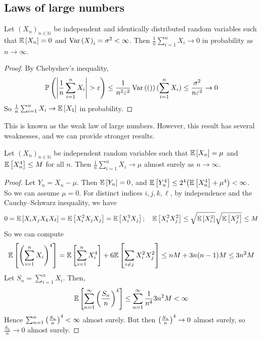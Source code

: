 \subsection{Laws of large numbers}
\begin{proposition}
	Let \( (X_n)_{n \in \mathbb N} \) be independent and identically distributed random variables such that \( \mathbb{E}\left[{X_n}\right] = 0 \) and \( \operatorname{Var}\left({X}\right)_i = \sigma^2 < \infty \).
	Then \( \frac{1}{n} \sum_{i=1}^n X_i \to 0 \) in probability as \( n \to \infty \).
\end{proposition}
\begin{proof}
	By Chebyshev's inequality,
	\[ \mathbb{P}\left({\abs{\frac{1}{n}\sum_{i=1}^n X_i} > \varepsilon}\right) \leq \frac{1}{n^2 \varepsilon^2} \operatorname{Var}\left({\qty}\right)(\sum_{i=1}^n X_i) \leq \frac{\sigma^2}{n\varepsilon^2} \to 0 \]
	So \( \frac{1}{n} \sum_{i=1}^n X_i \to \mathbb{E}\left[{X_1}\right] \) in probability.
\end{proof}
This is known as the weak law of large numbers.
However, this result has several weaknesses, and we can provide stronger results.
\begin{proposition}
	Let \( (X_n)_{n \in \mathbb N} \) be independent random variables such that \( \mathbb{E}\left[{X_n}\right] = \mu \) and \( \mathbb{E}\left[{X_n^4}\right] \leq M \) for all \( n \).
	Then \( \frac{1}{n} \sum_{i=1}^n X_i \to \mu \) almost surely as \( n \to \infty \).
\end{proposition}
\begin{proof}
	Let \( Y_n = X_n - \mu \).
	Then \( \mathbb{E}\left[{Y_n}\right] = 0 \), and \( \mathbb{E}\left[{Y_n^4}\right] \leq 2^4 \qty(\mathbb{E}\left[{X_n^4}\right] + \mu^4) < \infty \).
	So we can assume \( \mu = 0 \).
	For distinct indices \( i, j, k, \ell \), by independence and the Cauchy--Schwarz inequality, we have
	\[ 0 = \mathbb{E}\left[{X_i X_j X_k X_\ell}\right] = \mathbb{E}\left[{X_i^2 X_j X_j}\right] = \mathbb{E}\left[{X_i^3 X_j}\right];\quad \mathbb{E}\left[{X_i^2 X_j^2}\right] \leq \sqrt{\mathbb{E}\left[{X_i^2}\right]}\sqrt{\mathbb{E}\left[{X_j^2}\right]} \leq M \]
	So we can compute
	\[ \mathbb{E}\left[{\qty(\sum_{i=1}^n X_i)^4}\right] = \mathbb{E}\left[{\sum_{i=1}^n X_i^4}\right] + 6\mathbb{E}\left[{\sum_{i \neq j} X_i^2 X_j^2}\right] \leq nM + 3n(n-1)M \leq 3n^2 M \]
	Let \( S_n = \sum_{i=1}^n X_i \).
	Then,
	\[ \mathbb{E}\left[{\sum_{n=1}^\infty \qty(\frac{S_n}{n})^4}\right] \leq \sum_{n=1}^\infty \frac{1}{n^4} 3n^2 M < \infty \]
	Hence \( \sum_{n=1}^n \qty(\frac{S_n}{n})^4 < \infty \) almost surely.
	But then \( \qty(\frac{S_n}{n})^4 \to 0 \) almost surely, so \( \frac{S_n}{n} \to 0 \) almost surely.
\end{proof}

